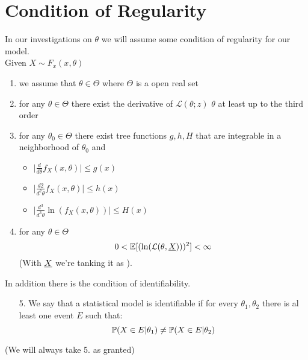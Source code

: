 \section{Condition of Regularity}
In our investigations on $\theta$ we will assume some condition of regularity for our model.\\
Given $X\sim F_x(x,\theta)$
\begin{enumerate}
	\item we assume that $\theta \in \Theta$ where $\Theta$  is a open real set
	\item for any $\theta \in \Theta$ there exist the  derivative of $\mathcal{L}(\theta;z)$ \wrt $\theta$ at least up to the third order
	\item for any $\theta_0 \in \Theta$ there exist tree functions $g,h,H$ that are integrable in a neighborhood of $\theta_0$  and 
	\begin{itemize}
		\item $\bigg| \frac{d}{d\theta} f_X(x,\theta) \bigg|\leq g(x)$
		\item $\bigg| \frac{d2}{d^2\theta} f_X(x,\theta) \bigg|\leq h(x)$
		\item $\bigg| \frac{d^3}{d^3\theta} \ln(f_X(x,\theta)) \bigg|\leq H(x)$
	\end{itemize}
	\item for any $\theta \in \Theta$
	$$0<\mathbb{E}[(\ln(\mathcal{L}(\theta, \underline X)))^2]<\infty$$
	(With $\underline X$ we're tanking it as \rv).
\end{enumerate}
In addition there is the condition of identifiability.
\begin{itemize}
	\item[5.] We say that a statistical model is identifiable if for every  $\theta_1,\theta_2$ there is al least one event $E$ such that:
	$$\mathbb{P}(X\in E | \theta_1)\not =\mathbb{P}(X\in E | \theta_2)$$
\end{itemize}
(We will always take 5. as granted)
